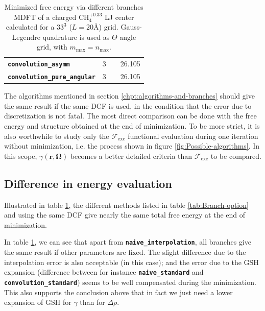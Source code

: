 \begin{table}[!b]
\begin{centering}
\begin{tabular*}{1\linewidth}{@{\extracolsep{\fill}}lccc}
\texttt{\textbf{\scriptsize{}convolution\_asymm}} & {\scriptsize{}3} & {\scriptsize{}\citep{puibasset_bridge_2012}} & {\scriptsize{}26.105}\tabularnewline
\addlinespace[-0.33em]
\texttt{\textbf{\scriptsize{}convolution\_pure\_angular}} & {\scriptsize{}3} & {\scriptsize{}\citep{puibasset_bridge_2012}} & {\scriptsize{}26.105}\tabularnewline
\bottomrule
\end{tabular*}
\par\end{centering}
\caption[Minimized free energy via different branches MDFT]{Minimized free energy via different branches MDFT of a charged $\mathrm{CH_{4}^{+0.33}}$
LJ center calculated for a $33^{3}$ ($L=20\textrm{Å}$) grid. Gauss-Legendre
quadrature is used as $\Theta$ angle grid, with $m_{\max}=n_{\max}$.\label{tab:free-energy}}
\end{table}
 

The algorithms mentioned in section \ref{chpt:algorithms-and-branches}
should give the same result if the same \acs{DCF} is used, in the
condition that the error due to discretization is not fatal. The most
direct comparison can be done with the free energy and structure obtained
at the end of minimization. To be more strict, it is also worthwhile
to study only the $\mathcal{F}_{\mathrm{exc}}$ functional evaluation
during one iteration without minimization, i.e. the process shown
in figure \ref{fig:Possible-algorithms}. In this scope, $\gamma(\mathbf{r},\mathbf{\Omega})$
becomes a better detailed criteria than $\mathcal{F}_{\mathrm{exc}}$
to be compared.

\subsection{Difference in energy evaluation}

Illustrated in table \ref{tab:free-energy}, the different methods
listed in table \ref{tab:Branch-option} and using the same \acs{DCF}
give nearly the same total free energy at the end of minimization.

In table \ref{tab:free-energy}, we can see that apart from \texttt{\textbf{naive\_interpolation}},
all branches give the same result if other parameters are fixed. The
slight difference due to the interpolation error is also acceptable
(in this case); and the error due to the \acs{GSH} expansion (difference
between for instance \texttt{\textbf{naive\_standard}} and \texttt{\textbf{convolution\_standard}})
seems to be well compensated during the minimization. This also supports
the conclusion above that in fact we just need a lower expansion of
\acs{GSH} for $\gamma$ than for $\Delta\rho$.

